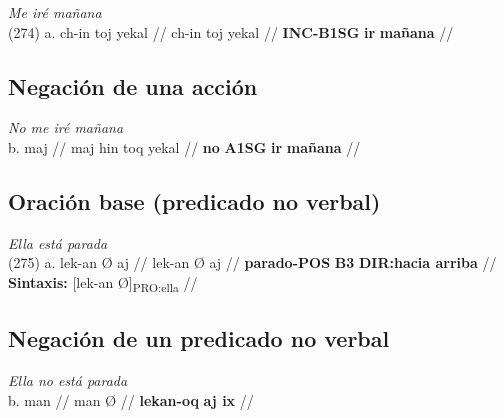 \documentclass{article}%
\begin{document}
%
\par\medskip%
\ex
\textit{Me iré mañana} \\
\begingl
\gla (274) a. ch-in toj yekal //
\glb ch-in toj yekal //
\glc \textbf{INC-B1SG} \textbf{ir} \textbf{mañana} //
\endgl
\xe
%
\medskip%
\subsection{Negación de una acción}%
\label{subsec:Negacindeunaaccin}%

%
\par\medskip%
\ex
\textit{No me iré mañana} \\
\begingl
\gla b. maj //
\glb maj hin toq yekal //
\glc \textbf{no} \textbf{A1SG} \textbf{ir} \textbf{mañana} //
\endgl
\xe
%
\medskip%
\subsection{Oración base (predicado no verbal)}%
\label{subsec:Oracinbase(predicadonoverbal)}%

%
\par\medskip%
\ex
\textit{Ella está parada} \\
\begingl
\gla (275) a. lek-an Ø aj //
\glb lek-an Ø aj //
\glc \textbf{parado-POS} \textbf{B3} \textbf{DIR:hacia arriba} //
\glft \textbf{Sintaxis:} [lek-an Ø]\textsubscript{PRO:ella} //
\endgl
\xe
%
\medskip%
\subsection{Negación de un predicado no verbal}%
\label{subsec:Negacindeunpredicadonoverbal}%

%
\par\medskip%
\ex
\textit{Ella no está parada} \\
\begingl
\gla b. man //
\glb man Ø //
\glc \textbf{lekan-oq} \textbf{aj ix} //
\endgl
\xe
%
\medskip

%
\end{document}

